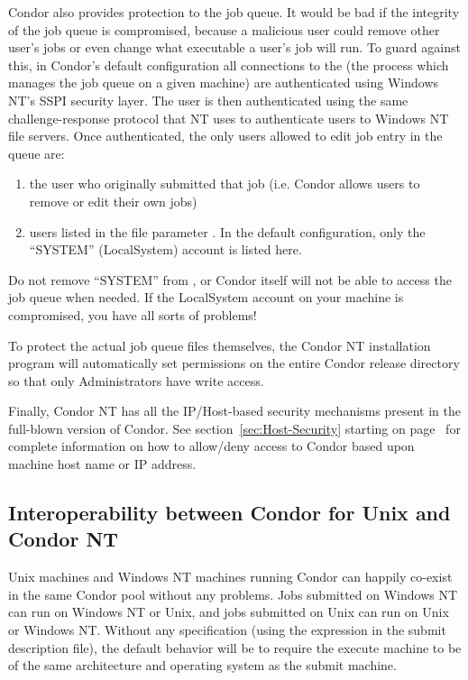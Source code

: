 Condor also provides protection to the job queue.  It would be bad if the
integrity of the job queue is compromised, because a malicious user could
remove other user's jobs or even change what executable a user's job will
run.  To guard against this, in Condor's default configuration all connections to the  (the
process which manages the job queue on a given machine) are authenticated
using Windows NT's SSPI security layer.  The user is then authenticated
using the same challenge-response protocol that NT uses to authenticate
users to Windows NT file servers.  Once authenticated, the only users
allowed to edit job entry in the queue are:
\begin{enumerate}
\item the user who originally submitted that job (i.e. Condor allows users
to remove or edit their own jobs)
\item users listed in the  file parameter
.  In the default configuration, only the
``SYSTEM'' (LocalSystem) account is listed here.  
\end{enumerate}
\Warn Do not remove ``SYSTEM'' from , or
Condor itself will not be able to access the job queue when needed.  If the
LocalSystem account on your machine is compromised, you have all sorts of
problems!

To protect the actual job queue files themselves, the Condor NT installation
program will automatically set permissions on the entire Condor release
directory so that only Administrators have write access.

Finally, Condor NT has all the IP/Host-based security mechanisms present
in the full-blown version of Condor.  See section~\ref{sec:Host-Security}
starting on page~\pageref{sec:Host-Security} for complete information
on how to allow/deny access to Condor based upon machine host name or
IP address.

\subsection{Interoperability between Condor for Unix and Condor NT}

Unix machines and Windows NT machines running Condor can happily
co-exist in the same Condor pool without any problems.
Jobs submitted on Windows NT can run on Windows NT or Unix,
and jobs submitted on Unix can run on Unix or Windows NT.
Without any specification
(using the  expression in the submit description file),
the default behavior will be to 
require the execute machine to be of the same architecture and operating
system as the submit machine.

